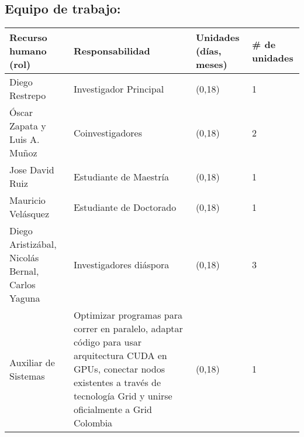 \subsection{Equipo de trabajo:}
\begin{tabular}{|p{3.7cm}|p{5cm} |l|l|}\hline
Recurso humano (rol)& Responsabilidad& Unidades (días, meses)& \# de unidades\\\hline
Diego Restrepo&Investigador Principal&(0,18)&1\\\hline
Óscar Zapata y Luis A. Muñoz & Coinvestigadores &(0,18)&2\\\hline
Jose David Ruiz & Estudiante de Maestría &(0,18)&1 \\\hline
Mauricio Velásquez & Estudiante de Doctorado &(0,18)&1\\\hline
Diego Aristizábal,
Nicolás Bernal, 
Carlos Yaguna & Investigadores diáspora &(0,18)&3\\\hline
Auxiliar de Sistemas & Optimizar programas para correr en paralelo, 
                       adaptar código para usar arquitectura CUDA en GPUs, 
                       conectar nodos existentes a través de tecnología 
                       Grid y unirse oficialmente a Grid Colombia &(0,18)&1\\\hline
\end{tabular}

